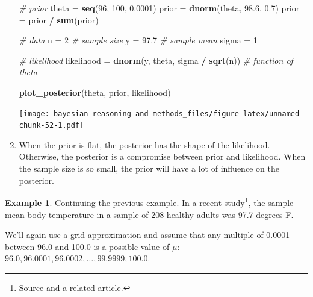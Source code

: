 \documentclass[
]{book}
\newenvironment{Shaded}{\begin{snugshade}}{\end{snugshade}}
\newcommand{\CommentTok}[1]{\textcolor[rgb]{0.56,0.35,0.01}{\textit{#1}}}
\newcommand{\DecValTok}[1]{\textcolor[rgb]{0.00,0.00,0.81}{#1}}
\newcommand{\FloatTok}[1]{\textcolor[rgb]{0.00,0.00,0.81}{#1}}
\newcommand{\KeywordTok}[1]{\textcolor[rgb]{0.13,0.29,0.53}{\textbf{#1}}}
\newcommand{\NormalTok}[1]{#1}
\newcommand{\OperatorTok}[1]{\textcolor[rgb]{0.81,0.36,0.00}{\textbf{#1}}}
\newcommand{\StringTok}[1]{\textcolor[rgb]{0.31,0.60,0.02}{#1}}
\theoremstyle{definition}
\theoremstyle{definition}
\newtheorem{example}{Example}[chapter]
\theoremstyle{definition}
\theoremstyle{remark}
\begin{document}
\begin{enumerate}
\begin{Shaded}
\begin{Highlighting}[]
\CommentTok{\# prior}
\NormalTok{theta =}\StringTok{ }\KeywordTok{seq}\NormalTok{(}\DecValTok{96}\NormalTok{, }\DecValTok{100}\NormalTok{, }\FloatTok{0.0001}\NormalTok{)}
\NormalTok{prior =}\StringTok{ }\KeywordTok{dnorm}\NormalTok{(theta, }\FloatTok{98.6}\NormalTok{, }\FloatTok{0.7}\NormalTok{)}
\NormalTok{prior =}\StringTok{ }\NormalTok{prior }\OperatorTok{/}\StringTok{ }\KeywordTok{sum}\NormalTok{(prior)}

\CommentTok{\# data}
\NormalTok{n =}\StringTok{ }\DecValTok{2} \CommentTok{\# sample size}
\NormalTok{y =}\StringTok{ }\FloatTok{97.7} \CommentTok{\# sample mean}
\NormalTok{sigma =}\StringTok{ }\DecValTok{1}

\CommentTok{\# likelihood}
\NormalTok{likelihood =}\StringTok{ }\KeywordTok{dnorm}\NormalTok{(y, theta, sigma }\OperatorTok{/}\StringTok{ }\KeywordTok{sqrt}\NormalTok{(n)) }\CommentTok{\# function of theta}

\KeywordTok{plot\_posterior}\NormalTok{(theta, prior, likelihood)}
\end{Highlighting}
\end{Shaded}

  \texttt{[image: bayesian-reasoning-and-methods\_files/figure-latex/unnamed-chunk-52-1.pdf]}
\item
  When the prior is flat, the posterior has the shape of the likelihood. Otherwise, the posterior is a compromise between prior and likelihood. When the sample size is so small, the prior will have a lot of influence on the posterior.
\end{enumerate}

\begin{example}
\protect\hypertarget{exm:body-temp-discrete3}{}{\label{exm:body-temp-discrete3} }
Continuing the previous example.
In a recent study\footnote{\href{https://www.ncbi.nlm.nih.gov/pmc/articles/PMC6258625/}{Source} and a \href{https://www.scientificamerican.com/article/are-human-body-temperatures-cooling-down/}{related article}.}, the sample mean body temperature in a sample of 208 healthy adults was 97.7 degrees F.

We'll again use a grid approximation and assume that any multiple of 0.0001 between 96.0 and 100.0 is a possible value of \(\mu\): \(96.0, 96.0001, 96.0002, \ldots, 99.9999, 100.0\).
\end{example}
\end{document}

